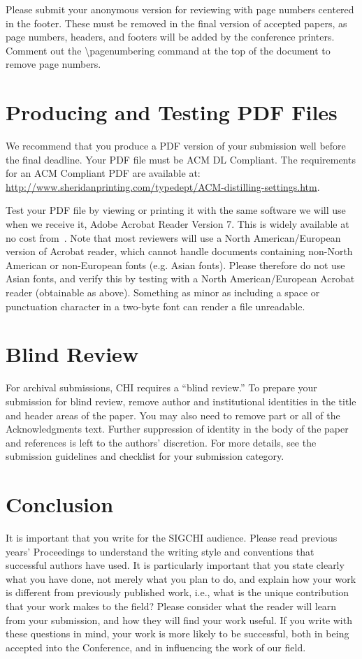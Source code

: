 \documentclass{article}
\begin{document}
Please submit your anonymous version for reviewing with page numbers
centered in the footer.  These must be removed in the final version of
accepted papers, as page numbers, headers, and footers will be added
by the conference printers.  Comment out the {\textbackslash}pagenumbering
command at the top of the document to remove page numbers.

\section{Producing and Testing PDF Files}

We recommend that you produce a PDF version of your submission well
before the final deadline.  Your PDF file must be ACM DL
Compliant. The requirements for an ACM Compliant PDF are available at:
{\url{http://www.sheridanprinting.com/typedept/ACM-distilling-settings.htm}}.

Test your PDF file by viewing or printing it with the same software we
will use when we receive it, Adobe Acrobat Reader Version 7. This is
widely available at no cost from~\cite{acrobat}.  Note that most
reviewers will use a North American/European version of Acrobat
reader, which cannot handle documents containing non-North American or
non-European fonts (e.g. Asian fonts).  Please therefore do not use
Asian fonts, and verify this by testing with a North American/European
Acrobat reader (obtainable as above). Something as minor as including
a space or punctuation character in a two-byte font can render a file
unreadable.

\section{Blind Review}

For archival submissions, CHI requires a ``blind review.'' To prepare
your submission for blind review, remove author and institutional
identities in the title and header areas of the paper. You may also
need to remove part or all of the Acknowledgments text.  Further
suppression of identity in the body of the paper and references is
left to the authors' discretion. For more details, see the submission
guidelines and checklist for your submission category.

\section{Conclusion}

It is important that you write for the SIGCHI audience.  Please read
previous years' Proceedings to understand the writing style and
conventions that successful authors have used.  It is particularly
important that you state clearly what you have done, not merely what
you plan to do, and explain how your work is different from previously
published work, i.e., what is the unique contribution that your work
makes to the field?  Please consider what the reader will learn from
your submission, and how they will find your work useful.  If you
write with these questions in mind, your work is more likely to be
successful, both in being accepted into the Conference, and in
influencing the work of our field.
\end{document}
